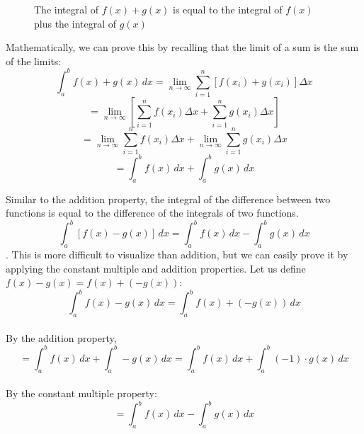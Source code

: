 \begin{figure}[H]
    \centering
    \caption{The integral of $f(x) + g(x)$ is equal to the integral 
    of $f(x)$ plus the integral of $g(x)$}
    \label{fig:intsum}
\end{figure}

Mathematically, we can prove this by recalling that the limit of a 
sum is the sum of the limits: $$\int_a^b f(x) + g(x)\,dx = 
\lim_{n \to \infty} \sum_{i=1}^n [f(x_i)+g(x_i)]\Delta x$$ 
$$=\lim_{n \to \infty} [\sum_{i=1}^n f(x_i)\Delta x + \sum_{i = 1}^n 
g(x_i) \Delta x]$$ $$= \lim_{n \to \infty}\sum_{i=1}^n f(x_i)\Delta 
x + \lim_{n \to \infty} \sum_{i = 1}^n g(x_i) \Delta x$$ $$ = 
\int_a^b f(x)\,dx + \int_a^b g(x)\,dx$$

Similar to the addition property, the integral of the difference 
between two functions is equal to the difference of the integrals of 
two functions. $$\int_a^b [f(x) - g(x)]\,dx = \int_a^b f(x)\,dx - 
\int_a^b g(x)\,dx$$. This is more difficult to visualize than addition, 
but we can easily prove it by applying the constant multiple and 
addition properties. Let us define $f(x) - g(x) = f(x) + (-g(x))$: 
$$\int_a^b f(x) - g(x)\,dx = \int_a^b f(x) + (-g(x))\,dx$$\\
By the addition property, $$=\int_a^b f(x)\,dx + \int_a^b -g(x)\,dx = 
\int_a^b f(x)\,dx + \int_a^b (-1)\cdot g(x)\,dx$$\\
By the constant multiple property: $$=\int_a^b f(x)\,dx - \int_a^b 
g(x)\,dx$$

